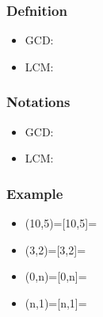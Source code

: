 \documentclass{article}
\begin{document}
\subsubsection{Defnition}
\begin{itemize}
    \item GCD:
    \item LCM:
\end{itemize}
\subsubsection{Notations}
\begin{itemize}
    \item GCD:
    \item LCM:
\end{itemize}

\subsubsection{Example}
\begin{itemize}
    \item (10,5)=\hspace{74px}[10,5]=
    \item (3,2)=\hspace{80px}[3,2]=
    \item (0,n)=\hspace{80px}[0,n]=
    \item (n,1)=\hspace{80px}[n,1]=
\end{itemize}
\end{document}
